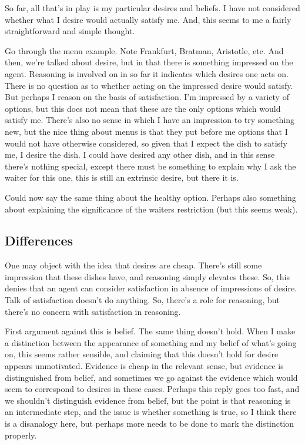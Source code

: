 \documentclass[10pt]{article}
\begin{document}
So far, all that's in play is my particular desires and beliefs.
I have not considered whether what I desire would actually satisfy me.
And, this seems to me a fairly straightforward and simple thought.


Go through the menu example.
Note Frankfurt, Bratman, Aristotle, etc.
And then, we're talked about desire, but in that there is something impressed on the agent.
Reasoning is involved on in so far it indicates which desires one acts on.
There is no question as to whether acting on the impressed desire would satisfy.
But perhaps I reason on the basis of satisfaction.
I'm impressed by a variety of options, but this does not mean that these are the only options which would satisfy me.
There's also no sense in which I have an impression to try something new, but the nice thing about menus is that they put before me options that I would not have otherwise considered, so given that I expect the dish to satisfy me, I desire the dish.
I could have desired any other dish, and in this sense there's nothing special, except there must be something to explain why I ask the waiter for this one, this is still an extrinsic desire, but there it is.

Could now say the same thing about the healthy option.
Perhaps also something about explaining the significance of the waiters restriction (but this seems weak).


\subsection{Differences}
\label{sec:differences}


One may object with the idea that desires are cheap.
There's still some impression that these dishes have, and reasoning simply elevates these.
So, this denies that an agent can consider satisfaction in absence of impressions of desire.
Talk of satisfaction doesn't do anything.
So, there's a role for reasoning, but there's no concern with satisfaction in reasoning.

First argument against this is belief.
The same thing doesn't hold.
When I make a distinction between the appearance of something and my belief of what's going on, this seems rather sensible, and claiming that this doesn't hold for desire appears unmotivated.
Evidence is cheap in the relevant sense, but evidence is distinguished from belief, and sometimes we go against the evidence which would seem to correspond to desires in these cases.
Perhaps this reply goes too fast, and we shouldn't distinguish evidence from belief, but the point is that reasoning is an intermediate step, and the issue is whether something is true, so I think there is a disanalogy here, but perhaps more needs to be done to mark the distinction properly.
\end{document}
